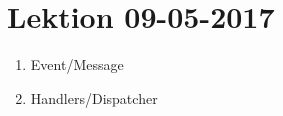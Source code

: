 \section{Lektion 09-05-2017}

\begin{enumerate}
	\item Event/Message
	\item Handlers/Dispatcher
\end{enumerate}
